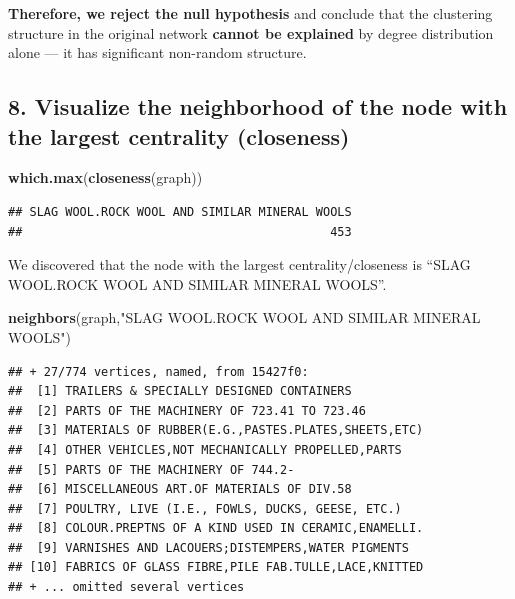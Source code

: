 \documentclass[
]{article}
\newenvironment{Shaded}{\begin{snugshade}}{\end{snugshade}}
\newcommand{\FunctionTok}[1]{\textcolor[rgb]{0.13,0.29,0.53}{\textbf{#1}}}
\newcommand{\NormalTok}[1]{#1}
\newcommand{\StringTok}[1]{\textcolor[rgb]{0.31,0.60,0.02}{#1}}
\begin{document}
\textbf{Therefore, we reject the null hypothesis} and conclude that the
clustering structure in the original network \textbf{cannot be
explained} by degree distribution alone --- it has significant
non-random structure.

\subsection{8. Visualize the neighborhood of the node with the largest
centrality
(closeness)}\label{visualize-the-neighborhood-of-the-node-with-the-largest-centrality-closeness}

\begin{Shaded}
\begin{Highlighting}[]
\FunctionTok{which.max}\NormalTok{(}\FunctionTok{closeness}\NormalTok{(graph))}
\end{Highlighting}
\end{Shaded}

\begin{verbatim}
## SLAG WOOL.ROCK WOOL AND SIMILAR MINERAL WOOLS 
##                                           453
\end{verbatim}

We discovered that the node with the largest centrality/closeness is
``SLAG WOOL.ROCK WOOL AND SIMILAR MINERAL WOOLS''.

\begin{Shaded}
\begin{Highlighting}[]
\FunctionTok{neighbors}\NormalTok{(graph,}\StringTok{"SLAG WOOL.ROCK WOOL AND SIMILAR MINERAL WOOLS"}\NormalTok{)}
\end{Highlighting}
\end{Shaded}

\begin{verbatim}
## + 27/774 vertices, named, from 15427f0:
##  [1] TRAILERS & SPECIALLY DESIGNED CONTAINERS          
##  [2] PARTS OF THE MACHINERY OF 723.41 TO 723.46        
##  [3] MATERIALS OF RUBBER(E.G.,PASTES.PLATES,SHEETS,ETC)
##  [4] OTHER VEHICLES,NOT MECHANICALLY PROPELLED,PARTS   
##  [5] PARTS OF THE MACHINERY OF 744.2-                  
##  [6] MISCELLANEOUS ART.OF MATERIALS OF DIV.58          
##  [7] POULTRY, LIVE (I.E., FOWLS, DUCKS, GEESE, ETC.)   
##  [8] COLOUR.PREPTNS OF A KIND USED IN CERAMIC,ENAMELLI.
##  [9] VARNISHES AND LACOUERS;DISTEMPERS,WATER PIGMENTS  
## [10] FABRICS OF GLASS FIBRE,PILE FAB.TULLE,LACE,KNITTED
## + ... omitted several vertices
\end{verbatim}
\end{document}

